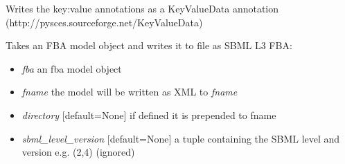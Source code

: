 \documentclass[a4paper,11pt,english]{sphinxmanual}
\begin{document}

\begin{fulllineitems}
\label{modules_doc:cbmpy.CBXML.sbml_writeKeyValueDataAnnotation}
Writes the key:value annotations as a KeyValueData annotation (http://pysces.sourceforge.net/KeyValueData)

\end{fulllineitems}


\begin{fulllineitems}
\label{modules_doc:cbmpy.CBXML.sbml_writeSBML2FBA}
Takes an FBA model object and writes it to file as SBML L3 FBA:
\begin{itemize}
\item {} 
\emph{fba} an fba model object

\item {} 
\emph{fname} the model will be written as XML to \emph{fname}

\item {} 
\emph{directory} {[}default=None{]} if defined it is prepended to fname

\item {} 
\emph{sbml\_level\_version} {[}default=None{]} a tuple containing the SBML level and version e.g. (2,4) (ignored)

\end{itemize}

\end{fulllineitems}

\end{document}
